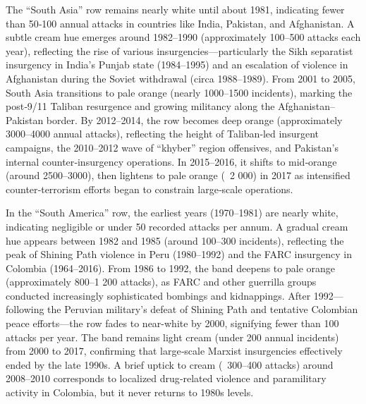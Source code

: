The “South Asia” row remains nearly white until about 1981, indicating fewer than 50‐100 annual attacks in countries like India, Pakistan, and Afghanistan. A subtle cream hue emerges around 1982–1990 (approximately 100–500 attacks each year), reflecting the rise of various insurgencies—particularly the Sikh separatist insurgency in India’s Punjab state (1984–1995) and an escalation of violence in Afghanistan during the Soviet withdrawal (circa 1988–1989). From 2001 to 2005, South Asia transitions to pale orange (nearly 1000–1500 incidents), marking the post‐9/11 Taliban resurgence and growing militancy along the Afghanistan–Pakistan border. By 2012–2014, the row becomes deep orange (approximately 3000–4000 annual attacks), reflecting the height of Taliban‐led insurgent campaigns, the 2010–2012 wave of “khyber” region offensives, and Pakistan’s internal counter‐insurgency operations. In 2015–2016, it shifts to mid‐orange (around 2500–3000), then lightens to pale orange (~2 000) in 2017 as intensified counter‐terrorism efforts began to constrain large‐scale operations.

In the “South America” row, the earliest years (1970–1981) are nearly white, indicating negligible or under 50 recorded attacks per annum. A gradual cream hue appears between 1982 and 1985 (around 100–300 incidents), reflecting the peak of Shining Path violence in Peru (1980–1992) and the FARC insurgency in Colombia (1964–2016). From 1986 to 1992, the band deepens to pale orange (approximately 800–1 200 attacks), as FARC and other guerrilla groups conducted increasingly sophisticated bombings and kidnappings. After 1992—following the Peruvian military’s defeat of Shining Path and tentative Colombian peace efforts—the row fades to near-white by 2000, signifying fewer than 100 attacks per year. The band remains light cream (under 200 annual incidents) from 2000 to 2017, confirming that large‐scale Marxist insurgencies effectively ended by the late 1990s. A brief uptick to cream (~300–400 attacks) around 2008–2010 corresponds to localized drug‐related violence and paramilitary activity in Colombia, but it never returns to 1980s levels.

